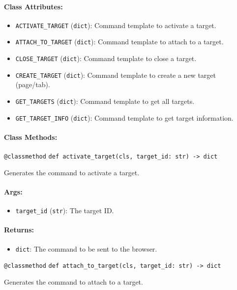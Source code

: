 \documentclass{article}
\begin{document}
\paragraph{Class Attributes:}
\begin{itemize}
    \item \texttt{ACTIVATE\_TARGET} (\texttt{dict}): Command template to activate a target.
    \item \texttt{ATTACH\_TO\_TARGET} (\texttt{dict}): Command template to attach to a target.
    \item \texttt{CLOSE\_TARGET} (\texttt{dict}): Command template to close a target.
    \item \texttt{CREATE\_TARGET} (\texttt{dict}): Command template to create a new target (page/tab).
    \item \texttt{GET\_TARGETS} (\texttt{dict}): Command template to get all targets.
    \item \texttt{GET\_TARGET\_INFO} (\texttt{dict}): Command template to get target information.
\end{itemize}

\paragraph{Class Methods:}
\noindent\texttt{@classmethod}
\noindent\texttt{def activate\_target(cls, target\_id: str) -> dict}

\noindent Generates the command to activate a target.

\paragraph{Args:}
\begin{itemize}
    \item \texttt{target\_id} (\texttt{str}): The target ID.
\end{itemize}

\paragraph{Returns:}
\begin{itemize}
    \item \texttt{dict}: The command to be sent to the browser.
\end{itemize}

\noindent\texttt{@classmethod}
\noindent\texttt{def attach\_to\_target(cls, target\_id: str) -> dict}

\noindent Generates the command to attach to a target.
\end{document}
